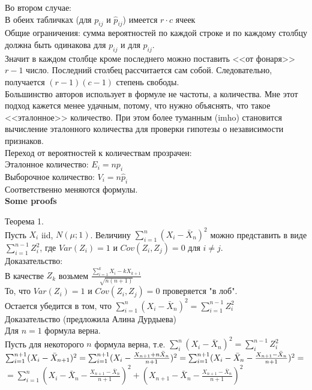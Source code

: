 \documentclass[pdftex,12pt,a4paper]{article}
\begin{document}
Во втором случае: \\
В обеих табличках (для $p_{ij}$ и $\hat{p}_{ij}$) имеется $r\cdot
c$ ячеек \\
Общие ограничения: сумма вероятностей по каждой строке и по
каждому столбцу должна быть одинакова для
$p_{ij}$ и для $\hat{p}_{ij}$. \\
Значит в каждом столбце кроме последнего можно поставить <<от
фонаря>> $r-1$ число. Последний столбец рассчитается сам собой.
Следовательно, получается $(r-1)(c-1)$ степень свободы. \\

Большинство авторов использует в формуле не частоты, а количества.
Мне этот подход кажется менее удачным, потому, что нужно
объяснять, что такое <<эталонное>> количество. При этом более
туманным (imho) становится вычисление эталонного количества для
проверки гипотезы о независимости признаков. \\
Переход от вероятностей к количествам прозрачен: \\
Эталонное количество: $E_{i}=np_{i}$ \\
Выборочное количество: $V_{i}=n\hat{p}_{i}$ \\
Соответственно меняются формулы. \\



\textbf{Some proofs}


Теорема 1. \\
Пусть $X_{i}$ iid, $N(\mu;1)$. Величину
$\sum_{i=1}^{n}(X_{i}-\bar{X}_{n})^{2}$ можно представить в виде
$\sum_{i=1}^{n-1}Z_{i}^{2}$, где $Var(Z_{i})=1$ и
$Cov(Z_{i},Z_{j})=0$ для $i \ne j$. \\

Доказательство: \\
В качестве $Z_{k}$ возьмем $\frac{\sum_{i=1}^{k}X_{i}-kX_{k+1}}{\sqrt{n(n+1)}}$ \\
То, что $Var(Z_{i})=1$ и $Cov(Z_{i},Z_{j})=0$ проверяется "в лоб".
\\
Остается убедится в том, что $\sum_{i=1}^{n}(X_{i}-\bar{X}_{n})^{2}=\sum_{i=1}^{n-1}Z_{i}^{2}$ \\
Доказательство (предложила Алина Дурдыева) \\

Для $n=1$ формула верна. \\
Пусть для некоторого $n$ формула верна, т.е.
$\sum_{i}^{n}(X_{i}-\bar{X}_{n})^{2}=\sum_{i}^{n-1}Z_{i}^{2}$ \\

$\sum_{i=1}^{n+1} (X_{i}-\bar{X}_{n+1})^{2}=
\sum_{i=1}^{n+1}(X_{i}-\frac{X_{n+1}+n\bar{X}_{n}}{n+1})^{2}=
\sum_{i=1}^{n+1}(X_{i}-\bar{X}_{n}-\frac{X_{n+1}-\bar{X}_{n}}{n+1})^{2}=\\$
$=\sum_{i=1}^{n}(X_{i}-\bar{X}_{n}-\frac{X_{n+1}-\bar{X}_{n}}{n+1})^{2}+
(X_{n+1}-\bar{X}_{n}-\frac{X_{n+1}-\bar{X}_{n}}{n+1})^{2}$ \\
\end{document}
